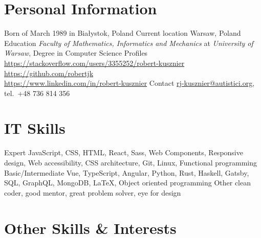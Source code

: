 

\section{Personal Information}

\begin{sectionlist}
    \sectionlistitem
        {Born}
        { of March 1989 in Bia\l{}ystok, Poland}
    \sectionlistitem
        {Current location}
        {Warsaw, Poland}
    \sectionlistitem
        {Education}
        {
            \emph{Faculty of Mathematics, Informatics and Mechanics} at
            \emph{University of Warsaw}, Degree in Computer
            Science
        }
    \sectionlistitem
        {Profiles}
        {
            \url{https://stackoverflow.com/users/3355252/robert-kusznier} \\
            \url{https://github.com/robertjk} \\
            \url{https://www.linkedin.com/in/robert-kusznier}
        }
    \sectionlistitem
        {Contact}
        {
            \href{mailto:rj-kusznier@autistici.org}{rj-kusznier@autistici.org},
            tel.~+48 736 814 356
        }
\end{sectionlist}


\section{IT Skills}

\begin{sectionlist}
    \sectionlistitem
        {Expert}
        {
            JavaScript, CSS, HTML, React, Sass, Web Components, Responsive
            design, Web accessibility, CSS architecture, Git, Linux, Functional
            programming
        }
    \sectionlistitem
        {Basic/Intermediate}
        {
            Vue, TypeScript, Angular, Python, Rust, Haskell, Gatsby, SQL, GraphQL, MongoDB, \LaTeX,
            Object oriented programming
        }
    \sectionlistitem
        {Other}
        {clean coder, good mentor, great problem solver, eye for design}
\end{sectionlist}


\section{Other Skills \& Interests}

